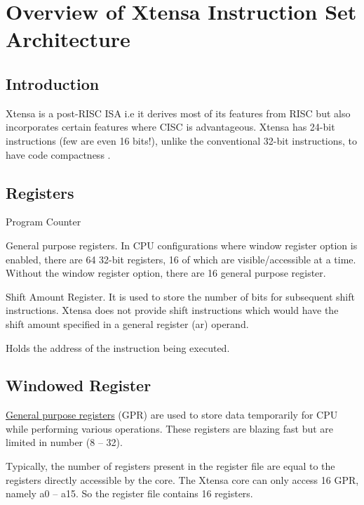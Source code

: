 \chapter{Overview of Xtensa Instruction Set Architecture}

\section{Introduction}

Xtensa is a post-RISC ISA i.e it derives most of its features from RISC but also incorporates  certain features where CISC is advantageous. Xtensa has 24-bit instructions (few are even 16 bits!), unlike the conventional 32-bit instructions, to have code compactness \cite{leibson2006designing, tensilica2008whitepaper}.

\section{Registers}
\begin{description}[leftmargin=8em,style=nextline]
  \item[PC] Program Counter
  \item[AR] General purpose registers. In CPU configurations where window register option is enabled, there are 64 32-bit registers, 16 of which are  visible/accessible at a time. Without the window register option, there are 16 general purpose register.
  \item[SAR] Shift Amount Register. It is used to store the number of bits for subsequent shift instructions. Xtensa does not provide shift instructions which would have the shift amount specified in a general register (ar) operand.
  \item[PC] Holds the address of the instruction being executed.
\end{description}

\section{Windowed Register}

\underline{General purpose registers} (GPR) are used to store data temporarily for CPU while performing various operations. These registers are blazing fast but are limited in number (8 -- 32).

Typically, the number of registers present in the register file are equal to the registers directly accessible by the core. The Xtensa core can only access 16 GPR, namely a0 -- a15. So the register file contains 16 registers.

